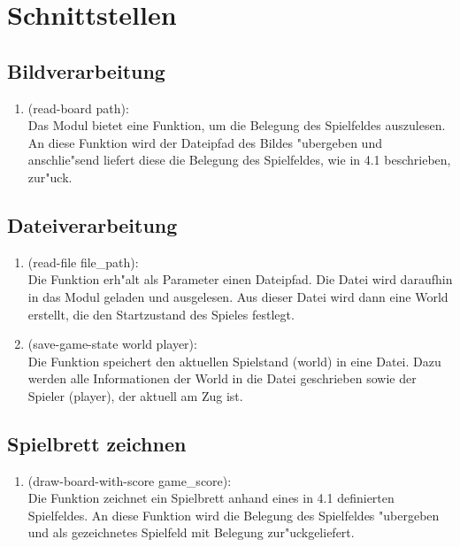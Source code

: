 \documentclass[a4paper]{scrreprt}
\begin{document}
 \chapter{Schnittstellen}
 \section{Bildverarbeitung}
\begin{enumerate}
\item (read-board path):\\
Das Modul bietet eine Funktion, um die Belegung des Spielfeldes auszulesen. An diese Funktion wird der Dateipfad des Bildes "ubergeben und anschlie"send liefert diese die Belegung des Spielfeldes, wie in 4.1 beschrieben, zur"uck.
\end{enumerate}

\section{Dateiverarbeitung}

\begin{enumerate}
\item (read-file file\_path):\\
Die Funktion erh"alt als Parameter einen Dateipfad. Die Datei wird daraufhin in das Modul geladen und ausgelesen. Aus dieser Datei wird dann eine World erstellt, die den Startzustand des Spieles festlegt. 

\item (save-game-state world player):\\
Die Funktion speichert den aktuellen Spielstand (world) in eine Datei. Dazu werden alle Informationen der World in die Datei geschrieben sowie der Spieler (player), der aktuell am Zug ist. 

\end{enumerate}
\section{Spielbrett zeichnen}

\begin{enumerate}
\item (draw-board-with-score game\_score):\\
Die Funktion zeichnet ein Spielbrett anhand eines in 4.1 definierten Spielfeldes. An diese Funktion wird die Belegung des Spielfeldes "ubergeben und als gezeichnetes Spielfeld mit Belegung zur"uckgeliefert. 
\end{enumerate}
\end{document}
